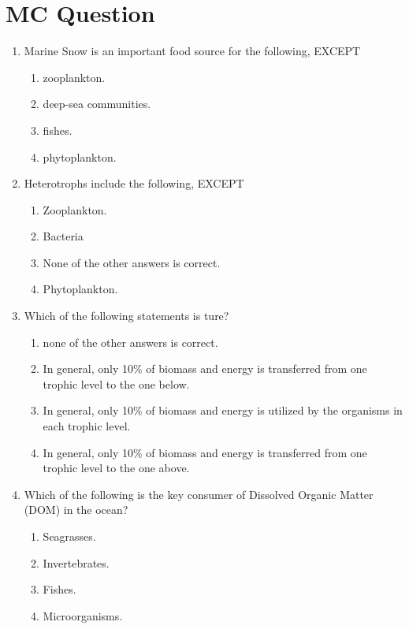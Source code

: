 \documentclass{report}
\begin{document}
\section{MC Question}
\begin{enumerate}
    \item Marine Snow is an important food source for the following, EXCEPT
    \begin{enumerate}
        \item   zooplankton. 
        \item   deep-sea communities. 
        \item   fishes. 
        \item   phytoplankton. 
    \end{enumerate}
    \item Heterotrophs include the following, EXCEPT
    \begin{enumerate}
        \item   Zooplankton. 
        \item   Bacteria 
        \item   None of the other answers is correct. 
        \item Phytoplankton.
    \end{enumerate}
    \item Which of the following statements is ture?
    \begin{enumerate}
        \item   none of the other answers is correct. 
        \item   In general, only 10$\%$ of biomass and energy is transferred from one trophic level to the one below.
        \item   In general, only 10$\%$ of biomass and energy is utilized by the organisms in each trophic level.
        \item   In general, only 10$\%$ of biomass and energy is transferred from one trophic level to the one above.
    \end{enumerate}
    \item Which of the following is the key consumer of Dissolved Organic Matter (DOM) in the ocean?
    \begin{enumerate}
        \item   Seagrasses. 
        \item   Invertebrates. 
        \item   Fishes. 
        \item   Microorganisms. 
    \end{enumerate}

\end{enumerate}
\end{document}
